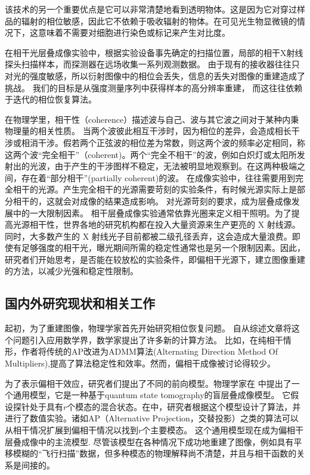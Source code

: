 \documentclass[12pt]{article}
\begin{document}
	该技术的另一个重要优点是它可以非常清楚地看到透明物体。这是因为它对穿过样品的辐射的相位敏感，因此它不依赖于吸收辐射的物体。在可见光生物显微镜的情况下，这意味着不需要对细胞进行染色或标记来产生对比度。
	
	在相干光层叠成像实验中，根据实验设备事先确定的扫描位置，局部的相干X射线探头扫描样本，而探测器在远场收集一系列观测数据。 由于现有的接收器往往只对光的强度敏感，所以衍射图像中的相位会丢失，信息的丢失对图像的重建造成了挑战。 我们的目标是从强度测量序列中获得样本的高分辨率重建， 而这往往依赖于迭代的相位恢复算法。 %
	
在物理学里，相干性（coherence）描述波与自己、波与其它波之间对于某种内秉物理量的相关性质。 当两个波彼此相互干涉时，因为相位的差异，会造成相长干涉或相消干涉。假若两个正弦波的相位差为常数，则这两个波的频率必定相同，称这两个波“完全相干”（coherent)。两个“完全不相干”的波，例如白炽灯或太阳所发射出的光波，由于产生的干涉图样不稳定，无法被明显地观察到。在这两种极端之间，存在着“部分相干”(partially coherent)的波。 在成像实验中，往往需要用到完全相干的光源。产生完全相干的光源需要苛刻的实验条件，有时候光源实际上是部分相干的，这就会对成像的结果造成影响。 对光源苛刻的要求，成为层叠成像发展中的一大限制因素。 相干层叠成像实验通常依靠光圈来定义相干照明。为了提高光源相干性，世界各地的研究机构都在投入大量资源来生产更亮的 X 射线源。同时，大多数产生的 X 射线光子目前都被二级孔径丢弃，这会造成大量浪费。即使有足够强度的相干光，曝光期间所需的稳定性通常也是另一个限制因素。因此，研究者们开始思考，是否能在较放松的实验条件，即偏相干光源下，建立图像重建的方法，以减少光强和稳定性限制。
	

	
	
	

	\subsection{国内外研究现状和相关工作}
		起初，为了重建图像，物理学家首先开始研究相位恢复问题。 自从综述文章\cite{all}将这个问题引入应用数学界，数学家提出了许多新的计算方法。 比如，在纯相干情形，作者将传统的AP改进为ADMM算法(Alternating Direction Method Of Multipliers),提高了算法稳定性和效率\cite{admm}。然而，偏相干成像被讨论得较少。
	
		为了表示偏相干效应，研究者们提出了不同的前向模型。物理学家在 \cite{theory} 中提出了一个通用模型，它是一种基于quantum state tomography\cite{quan}的盲层叠成像模型。 它假设探针处于具有$r$个模态的混合状态。在\cite{mix}中，研究者根据这个模型设计了算法，并进行了数值实验。诸如AP（Alternative Projection，交替投影）之类的算法可以从相干情况扩展到偏相干情况以找到$r$个主要模态。 这个通用模型现在成为偏相干层叠成像中的主流模型. 尽管该模型在各种情况下成功地重建了图像，例如具有平移模糊的“飞行扫描”数据，但多种模态的物理解释尚不清楚，并且与相干函数的关系是间接的。
		
\end{document}

